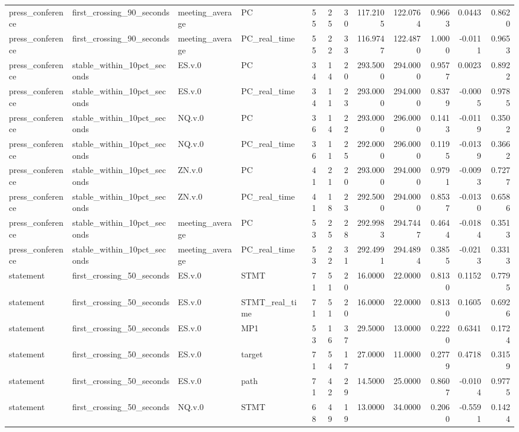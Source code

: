 \begin{tabular}{llllrrrrrrrr}
press_conference & first_crossing_90_seconds & meeting_average & PC & 55 & 25 & 30 & 117.2105 & 122.0764 & 0.9663 & 0.0443 & 0.8620 \\
press_conference & first_crossing_90_seconds & meeting_average & PC_real_time & 55 & 22 & 33 & 116.9747 & 122.4870 & 1.0000 & -0.0111 & 0.9653 \\
press_conference & stable_within_10pct_seconds & ES.v.0 & PC & 34 & 14 & 20 & 293.5000 & 294.0000 & 0.9577 & 0.0023 & 0.8922 \\
press_conference & stable_within_10pct_seconds & ES.v.0 & PC_real_time & 34 & 11 & 23 & 293.0000 & 294.0000 & 0.8379 & -0.0005 & 0.9785 \\
press_conference & stable_within_10pct_seconds & NQ.v.0 & PC & 36 & 14 & 22 & 293.0000 & 296.0000 & 0.1413 & -0.0119 & 0.3502 \\
press_conference & stable_within_10pct_seconds & NQ.v.0 & PC_real_time & 36 & 11 & 25 & 292.0000 & 296.0000 & 0.1195 & -0.0139 & 0.3662 \\
press_conference & stable_within_10pct_seconds & ZN.v.0 & PC & 41 & 21 & 20 & 293.0000 & 294.0000 & 0.9791 & -0.0093 & 0.7277 \\
press_conference & stable_within_10pct_seconds & ZN.v.0 & PC_real_time & 41 & 18 & 23 & 292.5000 & 294.0000 & 0.8537 & -0.0130 & 0.6586 \\
press_conference & stable_within_10pct_seconds & meeting_average & PC & 53 & 25 & 28 & 292.9983 & 294.7447 & 0.4644 & -0.0184 & 0.3513 \\
press_conference & stable_within_10pct_seconds & meeting_average & PC_real_time & 53 & 22 & 31 & 292.4991 & 294.4894 & 0.3855 & -0.0213 & 0.3313 \\
statement & first_crossing_50_seconds & ES.v.0 & STMT & 71 & 51 & 20 & 16.0000 & 22.0000 & 0.8130 & 0.1152 & 0.7795 \\
statement & first_crossing_50_seconds & ES.v.0 & STMT_real_time & 71 & 51 & 20 & 16.0000 & 22.0000 & 0.8130 & 0.1605 & 0.6926 \\
statement & first_crossing_50_seconds & ES.v.0 & MP1 & 53 & 16 & 37 & 29.5000 & 13.0000 & 0.2220 & 0.6341 & 0.1724 \\
statement & first_crossing_50_seconds & ES.v.0 & target & 71 & 54 & 17 & 27.0000 & 11.0000 & 0.2779 & 0.4718 & 0.3159 \\
statement & first_crossing_50_seconds & ES.v.0 & path & 71 & 42 & 29 & 14.5000 & 25.0000 & 0.8607 & -0.0104 & 0.9775 \\
statement & first_crossing_50_seconds & NQ.v.0 & STMT & 68 & 49 & 19 & 13.0000 & 34.0000 & 0.2060 & -0.5591 & 0.1424 \\

\end{tabular}
